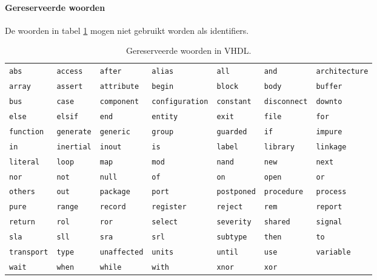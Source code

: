 \paragraph{Gereserveerde woorden}De woorden in tabel \ref{tbl:vHDLReservedWords} mogen niet gebruikt worden als identifiers.
\begin{table}[hbt]
\centering
\small{\begin{tabular}{lllllll}
\verb+abs+&\verb+access+&\verb+after+&\verb+alias+&\verb+all+&\verb+and+&\verb+architecture+\\
\verb+array+&\verb+assert+&\verb+attribute+&\verb+begin+&\verb+block+&\verb+body+&\verb+buffer+\\
\verb+bus+&\verb+case+&\verb+component+&\verb+configuration+&\verb+constant+&\verb+disconnect+&\verb+downto+\\
\verb+else+&\verb+elsif+&\verb+end+&\verb+entity+&\verb+exit+&\verb+file+&\verb+for+\\
\verb+function+&\verb+generate+&\verb+generic+&\verb+group+&\verb+guarded+&\verb+if+&\verb+impure+\\
\verb+in+&\verb+inertial+&\verb+inout+&\verb+is+&\verb+label+&\verb+library+&\verb+linkage+\\
\verb+literal+&\verb+loop+&\verb+map+&\verb+mod+&\verb+nand+&\verb+new+&\verb+next+\\
\verb+nor+&\verb+not+&\verb+null+&\verb+of+&\verb+on+&\verb+open+&\verb+or+\\
\verb+others+&\verb+out+&\verb+package+&\verb+port+&\verb+postponed+&\verb+procedure+&\verb+process+\\
\verb+pure+&\verb+range+&\verb+record+&\verb+register+&\verb+reject+&\verb+rem+&\verb+report+\\
\verb+return+&\verb+rol+&\verb+ror+&\verb+select+&\verb+severity+&\verb+shared+&\verb+signal+\\
\verb+sla+&\verb+sll+&\verb+sra+&\verb+srl+&\verb+subtype+&\verb+then+&\verb+to+\\
\verb+transport+&\verb+type+&\verb+unaffected+&\verb+units+&\verb+until+&\verb+use+&\verb+variable+\\
\verb+wait+&\verb+when+&\verb+while+&\verb+with+&\verb+xnor+&\verb+xor+
\end{tabular}}
\caption{Gereserveerde woorden in VHDL.}
\label{tbl:vHDLReservedWords}
\end{table}
